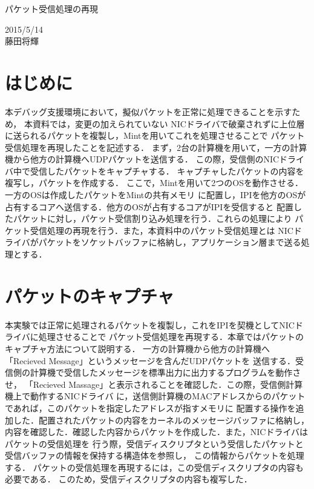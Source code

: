 \documentclass[12pt]{jsarticle}
\begin{document}

\begin{center}
    {\LARGE パケット受信処理の再現}
\end{center}

\begin{flushright}
  2015/5/14\\
  藤田将輝
\end{flushright}
\section{はじめに}
本デバッグ支援環境において，擬似パケットを正常に処理できることを示すため，
本資料では，変更の加えられていない
NICドライバで破棄されずに上位層に送られるパケットを複製し，Mintを用いてこれを処理させることで
パケット受信処理を再現したことを記述する．
まず，2台の計算機を用いて，一方の計算機から他方の計算機へUDPパケットを送信する．
この際，受信側のNICドライバ中で受信したパケットをキャプチャする．
キャプチャしたパケットの内容を複写し，パケットを作成する．
ここで，Mintを用いて2つのOSを動作させる．一方のOSは作成したパケットをMintの共有メモリ
に配置し，IPIを他方のOSが占有するコアへ送信する．他方のOSが占有するコアがIPIを受信すると
配置したパケットに対し，パケット受信割り込み処理を行う．これらの処理により
パケット受信処理の再現を行う．また，本資料中のパケット受信処理とは
NICドライバがパケットをソケットバッファに格納し，アプリケーション層まで送る処理とする．


\section{パケットのキャプチャ}\label{cpt}
本実験では正常に処理されるパケットを複製し，これをIPIを契機としてNICドライバに処理させることで
パケット受信処理を再現する．本章ではパケットのキャプチャ方法について説明する．
一方の計算機から他方の計算機へ「Recieved Message」というメッセージを含んだUDPパケットを
送信する．受信側の計算機で受信したメッセージを標準出力に出力するプログラムを動作させ，
「Recieved Massage」と表示されることを確認した．この際，受信側計算機上で動作するNICドライバ
に，送信側計算機のMACアドレスからのパケットであれば，このパケットを指定したアドレスが指すメモリに
配置する操作を追加した．配置されたパケットの内容をカーネルのメッセージバッファに格納し，
内容を確認した．確認した内容からパケットを作成した．また，NICドライバはパケットの受信処理を
行う際，受信ディスクリプタという受信したパケットと受信バッファの情報を保持する構造体を参照し，
この情報からパケットを処理する．
パケットの受信処理を再現するには，この受信ディスクリプタの内容も必要である．
このため，受信ディスクリプタの内容も複写した．
\end{document}

